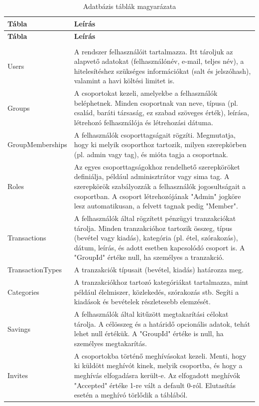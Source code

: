 \begin{longtable}{ | m{} | m{} | }
	\hline
	\textbf{Tábla} & \textbf{Leírás} \\
	\hline
	\endfirsthead
	
	\hline
	\textbf{Tábla} & \textbf{Leírás} \\
	\hline
	\endhead
	
	\hline
	\endfoot
	
	\hline
	\caption{Adatbázis táblák magyarázata} \label{tab:db-desc} \\
	\endlastfoot
	
	Users & A rendszer felhasználóit tartalmazza. Itt tároljuk az alapvető adatokat (felhasználónév, e-mail, teljes név), a hitelesítéshez szükséges információkat (salt és jelszóhash), valamint a havi költési limitet is. \\
	\hline
	Groups & A csoportokat kezeli, amelyekbe a felhasználók beléphetnek. Minden csoportnak van neve, típusa (pl. család, baráti társaság, ez szabad szöveges érték), leírása, létrehozó felhasználója és létrehozási dátuma. \\
	\hline
	GroupMemberships & A felhasználók csoporttagságait rögzíti. Megmutatja, hogy ki melyik csoporthoz tartozik, milyen szerepkörben (pl. admin vagy tag), és mióta tagja a csoportnak. \\
	\hline
	Roles & Az egyes csoporttagságokhoz rendelhető szerepköröket definiálja, például adminisztrátor vagy sima tag. A szerepkörök szabályozzák a felhasználók jogosultságait a csoportban. A csoport létrehozójának "Admin" jogköre lesz automatikusan, a felvett tagnak pedig "Member".\\
	\hline
	Transactions & A felhasználók által rögzített pénzügyi tranzakciókat tárolja. Minden tranzakcióhoz tartozik összeg, típus (bevétel vagy kiadás), kategória (pl. étel, szórakozás), dátum, leírás, és adott esetben kapcsolódó csoport is. A "GroupId" értéke null, ha személyes a tranzakció. \\
	\hline
	TransactionTypes & A tranzakciók típusait (bevétel, kiadás) határozza meg. \\
	\hline
	Categories & A tranzakciókhoz tartozó kategóriákat tartalmazza, mint például élelmiszer, közlekedés, szórakozás stb. Segíti a kiadások és bevételek részletesebb elemzését. \\
	\hline
	Savings & A felhasználók által kitűzött megtakarítási célokat tárolja. A célösszeg és a határidő opcionális adatok, tehát lehet null értékük. A "GroupId" értéke is null, ha személyes megtakarítás. \\
	\hline
	Invites & A csoportokba történő meghívásokat kezeli. Menti, hogy ki küldött meghívót kinek, melyik csoportba, és hogy a meghívás elfogadásra került-e. Az elfogadott meghívók "Accepted" értéke 1-re vált a default 0-ról. Elutasítás esetén a meghívó törlődik a táblából. \\
\end{longtable}

